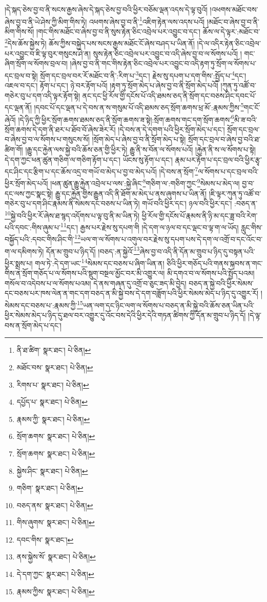 །དེ་སྐད་ཅེས་བྱ་བ་ནི་སངས་རྒྱས་ཞེས་དེ་སྐད་ཅེས་བྱ་བའི་ཕྱིར་བཅོམ་ལྡན་འདས་དེ་ལྟ་བུའོ། །འཕགས་མཐོང་བས་ཞེས་བྱ་བ་ནི་ཡེ་ཤེས་ཀྱི་མིག་གིས་ཏེ། འཕགས་ཞེས་བྱ་བ་ནི་\footnote{ནི་ཐ་ཚིག་  སྣར་ཐང་།  པེ་ཅིན། }འཇིག་རྟེན་ལས་འདས་པའོ། །མཐོང་བ་ཞེས་བྱ་བ་ནི་མིག་གིས་སོ། །གང་གིས་མཐོང་བ་ཞེས་བྱ་བ་ནི་སུས་རྟེན་ཅིང་འབྲེལ་པར་འབྱུང་བ་དང་། ཆོས་ལ་དེ་ལྟར་:མཐོང་བ་\footnote{མཐོང་བས་  སྣར་ཐང་།  པེ་ཅིན། }དེས་ཆོས་སྐྱེས་ཏེ། ཆོས་ཀྱིས་བསྐྱེད་པས་སངས་རྒྱས་མཐོང་ངོ་ཞེས་བཤད་པ་ཡིན་ནོ། །དེ་ལ་འདིར་རྟེན་ཅིང་འབྲེལ་པར་འབྱུང་བ་ཇི་ལྟ་བུར་གསུངས་ཤེ་ན། སུས་རྟེན་ཅིང་འབྲེལ་པར་འབྱུང་བ་འདི་ཞེས་བྱ་བ་ལ་སོགས་པའོ། །
གང་ཞིག་སྲོག་ལ་སོགས་བྲལ་བ། །ཞེས་བྱ་བ་ནི་གང་གིས་རྟེན་ཅིང་འབྲེལ་པར་འབྱུང་བ་འདི་རྟག་ཏུ་སྲོག་ལ་སོགས་པ་དང་བྲལ་བ་སྟེ། སྲོག་དང་བྲལ་བར་རོ་མཐོང་བ་ནི་:རིག་པ་\footnote{རིགས་པ་  སྣར་ཐང་།  པེ་ཅིན། }དང་། རྗེས་སུ་དཔག་པ་དག་གིས་:སྤྱོད་པ་\footnote{དཔྱོད་པ་  སྣར་ཐང་།  པེ་ཅིན། }དང་། འཇལ་བ་དང་། རྟོག་པ་དང་། ཉེ་བར་རྟོག་པའོ། །རྟག་ཏུ་སྲོག་མེད་པ་ཞེས་བྱ་བ་ནི་སྲོག་མེད་པའོ། །ཀུན་ཏུ་འཚོ་བ་གཅེར་བུ་པ་དག་འདི་ལྟར་རྟོག་སྟེ། ནང་དང་ཕྱི་རོལ་གྱི་དངོས་པོ་འདི་ཐམས་ཅད་ནི་སྲོག་དང་བཅས་ཤིང་དབང་པོ་དང་ལྡན་ནོ། །དབང་པོ་དང་ལྡན་པ་དེ་བས་ན་ས་གསུམ་པོ་འདི་ཐམས་ཅད་སྲོག་ཆགས་ཕྲ་མོ་:རྣམས་ཀྱིས་\footnote{རྣམས་ཀྱི་  སྣར་ཐང་།  པེ་ཅིན། }གང་ངོ་ཞེའོ། །དེ་ཉིད་ཀྱི་ཕྱིར་སྲོག་ཆགས་ཐམས་ཅད་ནི་སྲོག་ཆགས་ཟ་སྟེ།:སྲོག་ཆགས་གང་དག་སྲོག་ཆགས་\footnote{སྲོག་ཆགས་  སྣར་ཐང་།  པེ་ཅིན། }མི་ཟ་བའི་སྲོག་ཆགས་དེ་དག་ནི་ཐར་པ་ཐོབ་བོ་ཞེས་ཟེར་རོ། །དེ་བས་ན་དེ་དགག་པའི་ཕྱིར་སྲོག་མེད་པ་དང་། སྲོག་དང་བྲལ་བ་ཞེས་བྱ་བ་ལ་སོགས་པ་གསུངས་སོ། །སྲོག་མེད་པ་ཞེས་བྱ་བ་ནི་སྲོག་མེད་པ་སྟེ། སྲོག་དང་བྲལ་བ་ཞེས་བྱ་བའི་ཐ་ཚིག་གོ། །རྒྱུ་དང་རྐྱེན་ལས་སྐྱེ་བའི་ཆོས་ཅན་གྱི་ཕྱིར་ཏེ། རྒྱུ་ནི་ས་བོན་ལ་སོགས་པའོ། །རྐྱེན་ནི་ས་ལ་སོགས་པ་སྟེ། དེ་དག་ཀྱང་ཕན་ཚུན་གཅིག་ལ་གཅིག་རྟོག་པ་དང་། ཡོངས་སུ་རྟོག་པ་དང་། རྣམ་པར་རྟོག་པ་དང་བྲལ་བའི་ཕྱིར་རྩྭ་དང་ཤིང་དང་རྩིག་པ་དང་ཆོས་འདྲ་བ་གཡོ་བ་མེད་པ་བྱ་བ་མེད་པའོ། །དེ་བས་ན་སྲོག་\footnote{སྲོག་ཆགས་  སྣར་ཐང་།  པེ་ཅིན། }ལ་སོགས་པ་དང་བྲལ་བའི་ཕྱིར་སྲོག་མེད་པའོ། །ཕན་ཚུན་རྒྱུ་རྐྱེན་འབྲེལ་པ་ལས་:སྐྱེ་ཞིང་\footnote{སྐྱེས་ཤིང་  སྣར་ཐང་།  པེ་ཅིན། }གཅིག་ལ་:གཅིག་ཀྱང་\footnote{གཅིག་  སྣར་ཐང་།  པེ་ཅིན། }སེམས་པ་མེད་ལ། བྱ་བ་དང་ལས་ཀྱང་སྣང་སྟེ། རྒྱུ་དང་རྐྱེན་གྱིས་རྒྱུན་འདི་ནི་ཐོག་མ་མེད་པ་ནས་ཞུགས་པ་ཡིན་ནོ། །ཇི་ལྟར་ཀུན་ཏུ་འཚོ་བ་གཅེར་བུ་པ་དག་ཤིང་རྣམས་ནི་སེམས་དང་བཅས་པ་ཡིན་ཏེ། གཡོ་བའི་ཕྱིར་དང་། ཉལ་བའི་ཕྱིར་དང་། :བཅད་ན་\footnote{བཅད་ནས་  སྣར་ཐང་།  པེ་ཅིན། }སྐྱེ་བའི་ཕྱིར་རོ་ཞེས་ཐ་སྙད་འདོགས་པ་ལྟ་བུ་ནི་མ་ཡིན་ཏེ། ཕྱི་རོལ་གྱི་དངོས་པོ་རྣམས་ནི་ཉི་མ་དང་ཟླ་བའི་རེག་པའི་དབང་:གིས་ཞུམ་པ་\footnote{གིས་ཞུགས་  སྣར་ཐང་།  པེ་ཅིན། }དང་། རྒྱས་པར་རྗེས་སུ་དཔག་གི །དེ་དག་ལ་ཉལ་བ་དང་ལྡང་བ་ལྟ་ག་ལ་ཡོད། རླུང་གིས་བསྐྱོད་པའི་:དབང་གིས་ཤིང་གི་\footnote{དབང་གིས་  སྣར་ཐང་། }ཡལ་ག་ལ་སོགས་པ་འགུལ་བར་རྗེས་སུ་དཔག་པས་དེ་དག་ལ་འགྲོ་བ་དང་འོང་བ་ག་ལ་དམིགས་ཏེ། དོན་མ་གྲུབ་པ་ཉིད་དོ། །བཅད་:ན་སྐྱེའོ་\footnote{ནས་སྐྱེས་སོ་  སྣར་ཐང་།  པེ་ཅིན། }ཞེས་བྱ་བ་འདི་ནི་དོན་མ་གྲུབ་པ་ཉིད་དུ་བསྟན་པའི་ཕྱིར་སྨྲས་པ། གལ་ཏེ་:དེ་དག་ཡང་\footnote{དེ་དག་ཀྱང་  སྣར་ཐང་།  པེ་ཅིན། }སེམས་དང་བཅས་པ་ཞིག་ཡིན་ན། ཅིའི་ཕྱིར་གཅོད་པའི་གནས་སྐབས་ན་གང་གིས་ན་སྲོག་གཅོད་པ་ལ་སོགས་པའི་སྡུག་བསྔལ་མྱོང་བར་མི་འགྱུར་ལ། མི་དགའ་བ་ལ་སོགས་པའི་སྤྱོད་པའམ། གསོལ་བ་འདེབས་པ་ལ་སོགས་པའམ། དེ་ནས་གཞན་དུ་འགྲོ་བ་ཅུང་ཟད་མི་བྱེད། བཅད་ན་སྐྱེ་བའི་ཕྱིར་སེམས་དང་བཅས་པར་ཁས་ལེན་ན་གང་དག་བཅད་ན་མི་སྐྱེ་བས་དེ་དག་བཟློག་པའི་ཕྱིར་སེམས་མེད་པ་ཉིད་དུ་འགྱུར་རོ། །སེམས་དང་བཅས་པ་:རྣམས་ཀྱི་\footnote{རྣམས་ཀྱིས་  སྣར་ཐང་།  པེ་ཅིན། }ཡན་ལག་དང་ཉིང་ལག་ལ་སོགས་པ་བཅད་ན་མི་སྐྱེ་བའི་ཆོས་ཅན་ཡིན་པའི་ཕྱིར་སེམས་མེད་པ་ཉིད་དུ་ཐལ་བར་འགྱུར་དུ་འོང་བས་དེའི་ཕྱིར་དེའི་གཏན་ཚིགས་ཀྱི་དོན་མ་གྲུབ་པ་ཉིད་དོ། །དེ་ལྟ་བས་ན་སྲོག་མེད་པ་དང་། 
